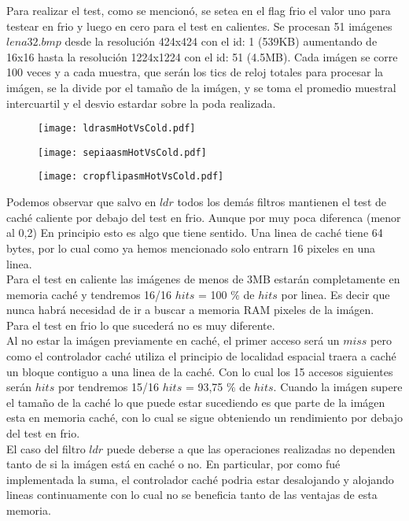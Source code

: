 Para realizar el test, como se mencionó, se setea en el flag frio el valor uno para testear en frio y luego en cero para el test en calientes.
Se procesan 51 imágenes $lena32.bmp$ desde la resolución 424x424 con el id: 1 (539KB) aumentando de 16x16 hasta la resolución 1224x1224 con el id: 51 (4.5MB). Cada imágen se corre 100 veces y a cada muestra, que serán los tics de reloj totales para procesar la imágen, se la divide por el tamaño de la imágen, y se toma el promedio muestral intercuartil y el desvio estardar sobre la poda realizada.

\begin{figure}[h]
  \begin{center}
	\texttt{[image: ldrasmHotVsCold.pdf]}
  \end{center}
\end{figure}

\begin{figure}[h]
  \begin{center}
	\texttt{[image: sepiaasmHotVsCold.pdf]}
  \end{center}
\end{figure}

\begin{figure}[h]
  \begin{center}
	\texttt{[image: cropflipasmHotVsCold.pdf]}
  \end{center}
\end{figure}

Podemos observar que salvo en $ldr$ todos los demás filtros mantienen el test de caché caliente por debajo del test en frio. Aunque por muy poca diferenca (menor al 0,2)
En principio esto es algo que tiene sentido. Una linea de caché tiene 64 bytes, por lo cual como ya hemos mencionado solo entrarn 16 pixeles en una linea. \\

Para el test en caliente las imágenes de menos de 3MB estarán completamente en memoria caché y tendremos 16/16 $hits$ = 100 $\%$ de $hits$ por linea. Es decir que nunca habrá necesidad de ir a buscar a memoria RAM pixeles de la imágen.\\ 
Para el test en frio lo que sucederá no es muy diferente. \\

Al no estar la imágen previamente en caché, el primer acceso será un $miss$ pero como el controlador caché utiliza el principio de localidad espacial traera a caché un bloque contiguo a una linea de la caché. Con lo cual los 15 accesos siguientes serán $hits$ por tendremos 15/16 $hits$ = 93,75 $\%$ de $hits$. 
Cuando la imágen supere el tamaño de la caché lo que puede estar sucediendo es que parte de la imágen esta en memoria caché, con lo cual se sigue obteniendo un rendimiento por debajo del test en frio.\\

El caso del filtro $ldr$ puede deberse a que las operaciones realizadas no dependen tanto de si la imágen está en caché o no. En particular, por como fué implementada la suma, el controlador caché podria estar desalojando y alojando lineas continuamente con lo cual no se beneficia tanto de las ventajas de esta memoria.

